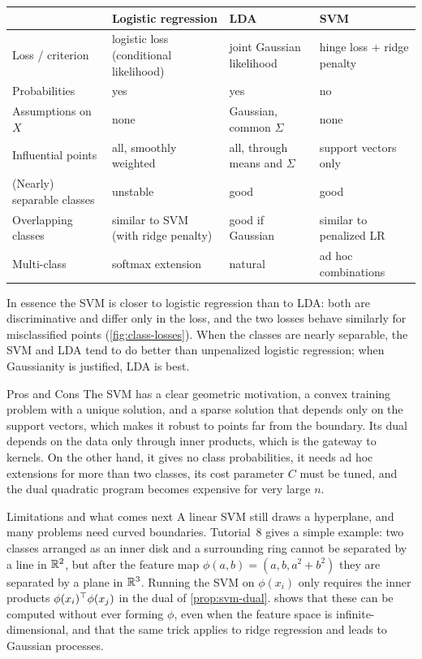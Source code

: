 \begin{center}
\small
\begin{tabularx}{\textwidth}{@{}l>{\raggedright\arraybackslash}X>{\raggedright\arraybackslash}X>{\raggedright\arraybackslash}X@{}}
\toprule
 & Logistic regression & LDA & SVM \\
\midrule
Loss / criterion & logistic loss (conditional likelihood) & joint Gaussian likelihood & hinge loss + ridge penalty \\
Probabilities & yes & yes & no \\
Assumptions on $X$ & none & Gaussian, common $\Sigma$ & none \\
Influential points & all, smoothly weighted & all, through means and $\Sigma$ & support vectors only \\
(Nearly) separable classes & unstable & good & good \\
Overlapping classes & similar to SVM (with ridge penalty) & good if Gaussian & similar to penalized LR \\
Multi-class & softmax extension & natural & ad hoc combinations \\
\bottomrule
\end{tabularx}
\end{center}

In essence the SVM is closer to logistic regression than to LDA: both are discriminative and differ only in the loss, and the two losses behave similarly for misclassified points (\cref{fig:class-losses}). When the classes are nearly separable, the SVM and LDA tend to do better than unpenalized logistic regression; when Gaussianity is justified, LDA is best.

\begin{notebox}{Pros and Cons}
The SVM has a clear geometric motivation, a convex training problem with a unique solution, and a sparse solution that depends only on the support vectors, which makes it robust to points far from the boundary. Its dual depends on the data only through inner products, which is the gateway to kernels. On the other hand, it gives no class probabilities, it needs ad hoc extensions for more than two classes, its cost parameter $C$ must be tuned, and the dual quadratic program becomes expensive for very large $n$.
\end{notebox}

\begin{notebox}{Limitations and what comes next}
A linear SVM still draws a hyperplane, and many problems need curved boundaries. Tutorial~8 gives a simple example: two classes arranged as an inner disk and a surrounding ring cannot be separated by a line in $\mathbb{R}^2$, but after the feature map $\phi(a,b)=(a,b,a^2+b^2)$ they are separated by a plane in $\mathbb{R}^3$. Running the SVM on $\phi(x_i)$ only requires the inner products $\phi(x_i)^{\top}\phi(x_j)$ in the dual of \cref{prop:svm-dual}.  shows that these can be computed without ever forming $\phi$, even when the feature space is infinite-dimensional, and that the same trick applies to ridge regression and leads to Gaussian processes.
\end{notebox}
